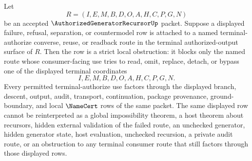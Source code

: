 \begin{corollary}
\label{cor:authorized-generator-recursor-terminal-authorize-strict-obstruction}
Let
$$
R=(I,E,M,B,D,O,A,H,C,P,G,N)
$$
be an accepted $\AuthorizedGeneratorRecursorUp$ packet. Suppose a displayed failure, refusal, separation, or countermodel row is attached to a named terminal-authorize converse, reuse, or readback route in the terminal authorized-output surface of $R$. Then the row is a strict local obstruction: it blocks only the named route whose consumer-facing use tries to read, omit, replace, detach, or bypass one of the displayed terminal coordinates
$$
I,E,M,B,D,O,A,H,C,P,G,N.
$$
Every permitted terminal-authorize use factors through the displayed branch, descent, output, audit, transport, continuation, package provenance, ground-boundary, and local $\NameCert$ rows of the same packet. The same displayed row cannot be reinterpreted as a global impossibility theorem, a host theorem about recursors, hidden external validation of the failed route, an unchecked generator, hidden generator state, host evaluation, unchecked recursion, a private audit route, or an obstruction to any terminal consumer route that still factors through those displayed rows.
\end{corollary}
